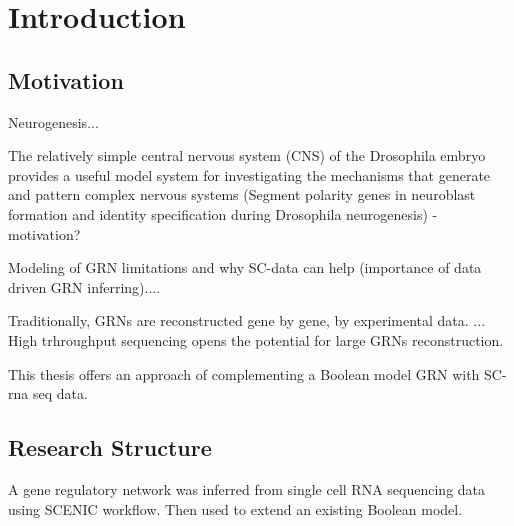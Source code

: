 \chapter{Introduction}\label{chap:introduction}

\section{Motivation}
Neurogenesis...

The relatively simple central nervous system (CNS) of the Drosophila embryo
provides a useful model system for investigating the mechanisms that generate and pattern complex nervous systems (Segment polarity genes in neuroblast formation and identity specification during Drosophila neurogenesis) - motivation?

Modeling of GRN limitations and why SC-data can help (importance of data driven GRN inferring)....


Traditionally, GRNs are reconstructed gene by gene, by experimental data. ...
High trhroughput sequencing opens the potential for large GRNs reconstruction. 

This thesis offers an approach of complementing a Boolean model GRN with SC-rna seq data. 


\section{Research Structure}
A gene regulatory network was inferred from single cell RNA sequencing data using SCENIC workflow. Then used to extend an existing Boolean model. 
